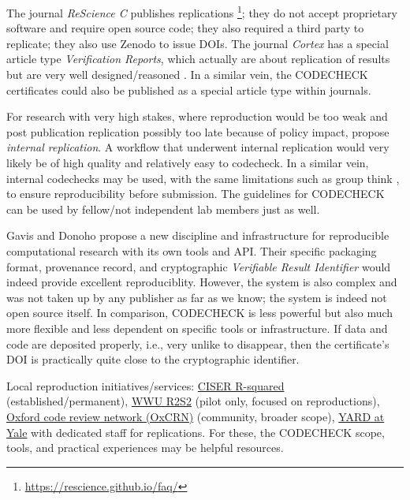 \documentclass[12pt]{article}
\begin{document}
The journal \emph{ReScience C} publishes replications
\footnote{\url{https://rescience.github.io/faq/}};
they do not accept proprietary software and require open source code;
they also required a third party to replicate; they also use Zenodo
to issue DOIs.
The journal \emph{Cortex} has a special article type 
\emph{Verification Reports}, which  actually are about replication of results 
but are very well designed/reasoned \cite{chambers_verification_2020}.
In a similar vein, the CODECHECK certificates
could also be published as a special article type within journals.

For research with very high stakes, where reproduction would be too weak and
post publication replication possibly too late because of policy impact,
\cite{benjamin-chung_internal_2020} propose \emph{internal replication}.
A workflow that underwent internal
replication would very likely be of high quality and relatively easy to codecheck.
In a similar vein, internal codechecks may be used, with the same limitations such
as group think \cite{benjamin-chung_internal_2020},
to ensure reproducibility before submission. The guidelines
for CODECHECK can be used by fellow/not independent lab members just as well.

Gavis and Donoho \cite{gavish_universal_2011} propose a new discipline and 
infrastructure for reproducible computational research with its own tools and
API. Their specific packaging format, provenance record, and cryptographic
\emph{Verifiable Result Identifier} would indeed provide excellent
reproduciblity. However, the system is also complex and was not taken up by
any publisher as far as we know; the system is indeed not open source itself.
In comparison, CODECHECK is less powerful but also much more flexible and
less dependent on specific tools or infrastructure. If data and code are 
deposited properly, i.e., very unlike to disappear, then the certificate's 
DOI is practically quite close to the cryptographic identifier.

Local reproduction initiatives/services:
\href{https://ciser.cornell.edu/research/results-reproduction-r-squared-service/}{CISER R-squared}
(established/permanent),
\href{https://go.wwu.de/r2s2}{WWU R2S2} (pilot only, focused on reproductions),
\href{https://github.com/OxfordCodeReviewNet/forum}{Oxford code review network (OxCRN)}
(community, broader scope), \href{https://isps.yale.edu/research/data/approach}{YARD 
at Yale} with dedicated staff for replications.
For these, the CODECHECK scope, tools, and practical experiences may be
helpful resources.
\end{document}
